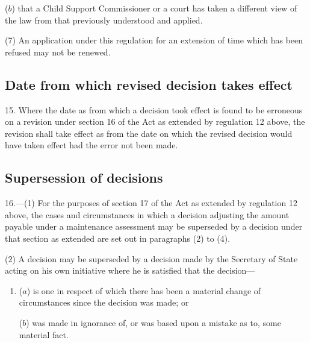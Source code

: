 \documentclass[12pt,a4paper]{article}
\begin{document}
{\begin{enumerate}
($b$) that a Child Support Commissioner or a court has taken a different view of the law from that previously understood and applied.
\end{enumerate}

(7) An application under this regulation for an extension of time which has been refused may not be renewed.


\subsection[15. Date from which revised decision takes effect]{Date from which revised decision takes effect}

15.  Where the date as from which a decision took effect is found to be erroneous on a revision under section 16 of the Act as extended by regulation 12 above, the revision shall take effect as from the date on which the revised decision would have taken effect had the error not been made.


\subsection[16. Supersession of decisions]{Supersession of decisions}

16.—(1) For the purposes of section 17 of the Act as extended by regulation 12 above, the cases and circumstances in which a decision adjusting the amount payable under a maintenance assessment may be superseded by a decision under that section as extended are set out in paragraphs (2) to (4).

(2) A decision may be superseded by a decision made by the Secretary of State acting on his own initiative where he is satisfied that the decision—
\begin{enumerate}\item[]
($a$) is one in respect of which there has been a material change of circumstances since the decision was made; or

($b$) was made in ignorance of, or was based upon a mistake as to, some material fact.
\end{enumerate}

}
\end{document}
